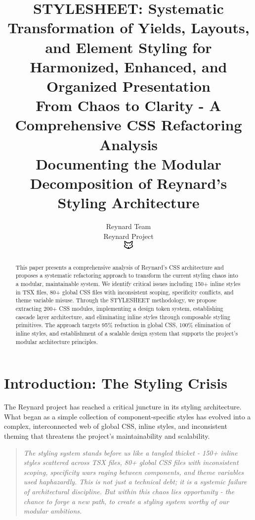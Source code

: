 \documentclass[11pt]{article}
\begin{document}
\title{\textbf{STYLESHEET: Systematic Transformation of Yields, Layouts, and Element Styling for Harmonized, Enhanced, and Organized Presentation} \\
\Large{From Chaos to Clarity - A Comprehensive CSS Refactoring Analysis} \\
\large{Documenting the Modular Decomposition of Reynard's Styling Architecture}}

\author{Reynard Team\\
Reynard Project\\
\includegraphics[width=0.5cm]{favicon.pdf}}

\maketitle

\begin{abstract}
This paper presents a comprehensive analysis of Reynard's CSS architecture and proposes a systematic refactoring approach to transform the current styling chaos into a modular, maintainable system. We identify critical issues including 150+ inline styles in TSX files, 80+ global CSS files with inconsistent scoping, specificity conflicts, and theme variable misuse. Through the STYLESHEET methodology, we propose extracting 200+ CSS modules, implementing a design token system, establishing cascade layer architecture, and eliminating inline styles through composable styling primitives. The approach targets 95\% reduction in global CSS, 100\% elimination of inline styles, and establishment of a scalable design system that supports the project's modular architecture principles.
\end{abstract}

\tableofcontents
\newpage

\section{Introduction: The Styling Crisis}

The Reynard project has reached a critical juncture in its styling architecture. What began as a simple collection of component-specific styles has evolved into a complex, interconnected web of global CSS, inline styles, and inconsistent theming that threatens the project's maintainability and scalability.

\begin{quote}
\emph{The styling system stands before us like a tangled thicket - 150+ inline styles scattered across TSX files, 80+ global CSS files with inconsistent scoping, specificity wars raging between components, and theme variables used haphazardly. This is not just a technical debt; it is a systemic failure of architectural discipline. But within this chaos lies opportunity - the chance to forge a new path, to create a styling system worthy of our modular ambitions.}
\end{quote}
\end{document}
